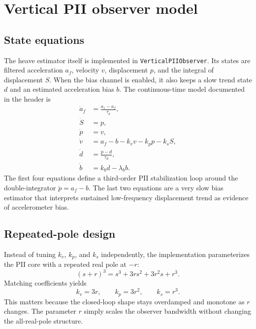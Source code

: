 \documentclass[conference]{IEEEtran}
\begin{document}
\section{Vertical PII observer model}
\subsection{State equations}
The heave estimator itself is implemented in \texttt{VerticalPIIObserver}. Its states are filtered acceleration $a_f$, velocity $v$, displacement $p$, and the integral of displacement $S$. When the bias channel is enabled, it also keeps a slow trend state $d$ and an estimated acceleration bias $b$. The continuous-time model documented in the header is
\begin{align}
\dot{a}_f &= \frac{a_z-a_f}{\tau_a}, \\
\dot{S} &= p, \\
\dot{p} &= v, \\
\dot{v} &= a_f - b - k_v v - k_p p - k_s S, \\
\dot{d} &= \frac{p-d}{\tau_d}, \\
\dot{b} &= k_b d - \lambda_b b.
\end{align}
The first four equations define a third-order PII stabilization loop around the double-integrator $\ddot{p}=a_f-b$. The last two equations are a very slow bias estimator that interprets sustained low-frequency displacement trend as evidence of accelerometer bias.

\subsection{Repeated-pole design}
Instead of tuning $k_v$, $k_p$, and $k_s$ independently, the implementation parameterizes the PII core with a repeated real pole at $-r$:
\begin{equation}
(s+r)^3 = s^3 + 3rs^2 + 3r^2s + r^3.
\end{equation}
Matching coefficients yields
\begin{equation}
 k_v = 3r, \qquad k_p = 3r^2, \qquad k_s = r^3.
\end{equation}
This matters because the closed-loop shape stays overdamped and monotone as $r$ changes. The parameter $r$ simply scales the observer bandwidth without changing the all-real-pole structure.
\end{document}
